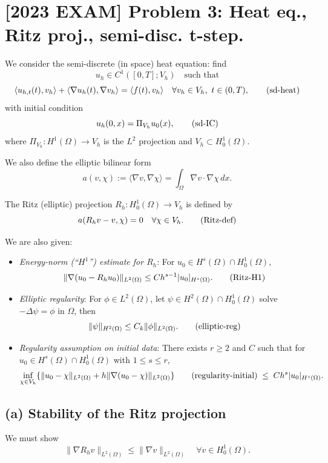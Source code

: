 \section*{[2023 EXAM] Problem 3: Heat eq., Ritz proj., semi-disc. t-step.}
We consider the semi-discrete (in space) heat equation: find
\[
    u_h \in C^1([0,T];V_h) \quad\text{such that}
\]
\[
    \langle u_{h,t}(t),v_h\rangle + \langle \nabla u_h(t),\nabla v_h\rangle
    = \langle f(t),v_h\rangle
    \quad\forall v_h\in V_h,\ t\in(0,T), \tag{\text{sd-heat}}
\]
with initial condition
\[
    u_h(0,x) = \Pi_{V_h}u_0(x), \tag{\text{sd-IC}}
\]
where $\Pi_{V_h}:H^1(\Omega)\to V_h$ is the $L^2$ projection and $V_h\subset H_0^1(\Omega)$.

We also define the elliptic bilinear form
\[
    a(v,\chi) := \langle \nabla v,\nabla \chi\rangle = \int_\Omega \nabla v\cdot\nabla\chi\,dx.
\]

The Ritz (elliptic) projection $R_h:H_0^1(\Omega)\to V_h$ is defined by
\[
    a(R_h v - v,\chi) = 0\quad\forall \chi\in V_h. \tag{\text{Ritz-def}}
\]

We are also given:
\begin{itemize}
\item \emph{Energy-norm (``$H^1$'') estimate for $R_h$}:
For $u_0\in H^s(\Omega)\cap H_0^1(\Omega)$,
\[
    \|\nabla(u_0 - R_h u_0)\|_{L^2(\Omega)} \le C h^{s-1} |u_0|_{H^s(\Omega)}.\tag{\text{Ritz-H1}}
\]

\item \emph{Elliptic regularity}: For $\phi\in L^2(\Omega)$, let $\psi\in H^2(\Omega)\cap H_0^1(\Omega)$
solve $-\Delta\psi = \phi$ in $\Omega$, then
\[
    \|\psi\|_{H^2(\Omega)} \le C_k \|\phi\|_{L^2(\Omega)}. \tag{\text{elliptic-reg}}
\]

\item \emph{Regularity assumption on initial data}: There exists $r\ge2$ and $C$ such that for
$u_0\in H^s(\Omega)\cap H_0^1(\Omega)$ with $1\le s\le r$,
\[
    \inf_{\chi\in V_h}
    \{\|u_0 - \chi\|_{L^2(\Omega)} + h\|\nabla(u_0 - \chi)\|_{L^2(\Omega)}\} \tag{\text{regularity-initial}}
    \;\le\;C h^s |u_0|_{H^s(\Omega)}.
\]
\end{itemize}

\subsection*{(a) Stability of the Ritz projection}

We must show
\[
    \|\nabla R_h v\|_{L^2(\Omega)} \le \|\nabla v\|_{L^2(\Omega)}\quad\forall v\in H_0^1(\Omega).
\]

